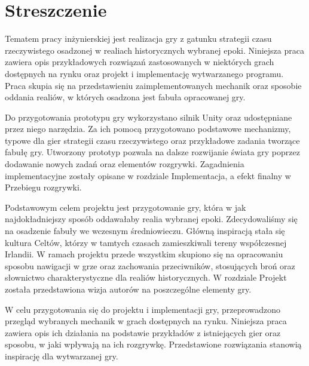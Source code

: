 \chapter*{Streszczenie}
Tematem pracy inżynierskiej jest realizacja gry z gatunku strategii czasu rzeczywistego osadzonej w realiach historycznych
wybranej epoki. Niniejsza praca zawiera opis przykładowych rozwiązań zastosowanych w niektórych grach dostępnych na rynku
oraz projekt i implementację wytwarzanego programu. Praca skupia się na przedstawieniu zaimplementowanych mechanik oraz
sposobie oddania realiów, w których osadzona jest fabuła opracowanej gry.

Do przygotowania prototypu gry wykorzystano silnik Unity oraz udostępniane przez niego narzędzia. Za ich pomocą
przygotowano podstawowe mechanizmy, typowe dla gier strategii czasu rzeczywistego oraz przykładowe zadania tworzące
fabułę gry. Utworzony prototyp pozwala na dalsze rozwijanie świata gry poprzez dodawanie nowych zadań oraz elementów
rozgrywki. Zagadnienia implementacyjne zostały opisane w rozdziale Implementacja, a efekt finalny w Przebiegu rozgrywki.

Podstawowym celem projektu jest przygotowanie gry, która w jak najdokładniejszy sposób oddawałaby realia wybranej epoki.
Zdecydowaliśmy się na osadzenie fabuły we wczesnym średniowieczu. Główną inspiracją stała się kultura Celtów, którzy w
tamtych czasach zamieszkiwali tereny współczesnej Irlandii. W ramach projektu przede wszystkim skupiono się na
opracowaniu sposobu nawigacji w grze oraz zachowania przeciwników, stosujących broń oraz słownictwo charakterystyczne
dla realiów historycznych. W rozdziale Projekt została przedstawiona wizja autorów na poszczególne elementy gry.

W celu przygotowania się do projektu i implementacji gry, przeprowadzono przegląd wybranych mechanik w grach dostępnych
na rynku. Niniejsza praca zawiera opis ich działania na podstawie przykładów z istniejących gier oraz sposobu, w jaki
wpływają na ich rozgrywkę. Przedstawione rozwiązania stanowią inspirację dla wytwarzanej gry.

